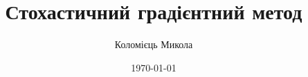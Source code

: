 \documentclass[a4paper, 14pt]{beamer}
\title{Стохастичний градієнтний метод}
\author{Коломієць Микола}
\date{\today}
\begin{document}
\maketitle

\begin{frame}
    
\end{frame}
\end{document}
